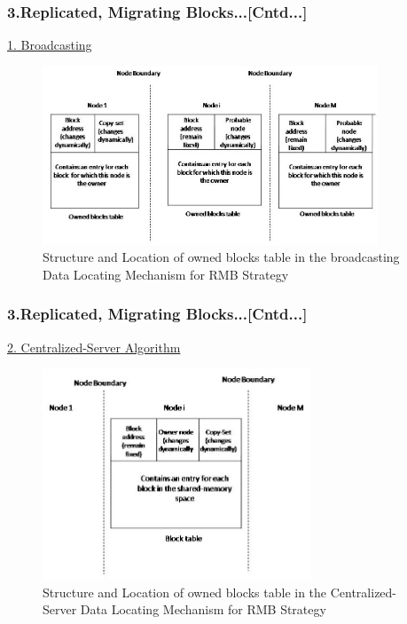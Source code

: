 \documentclass{beamer}
\begin{document}
\begin{frame}
	\frametitle{3.Replicated, Migrating Blocks...[Cntd...]}
	\vspace{0.25cm}
	\underline{1. Broadcasting}
	\begin{figure}
		\centering
		\includegraphics[width=10cm]{fig512.jpg}
		\caption{Structure and Location of owned blocks table in the broadcasting Data Locating Mechanism for RMB Strategy}
		\label{fig512}
	\end{figure}
\end{frame}


\begin{frame}
	\frametitle{3.Replicated, Migrating Blocks...[Cntd...]}
	\vspace{0.25cm}
	\underline{2. Centralized-Server Algorithm}
	\begin{figure}
		\centering
		\includegraphics[width=8cm]{fig513.jpg}
		\caption{Structure and Location of owned blocks table in the Centralized-Server Data Locating Mechanism for RMB Strategy}
		\label{fig513}
	\end{figure}
\end{frame}
\end{document}
